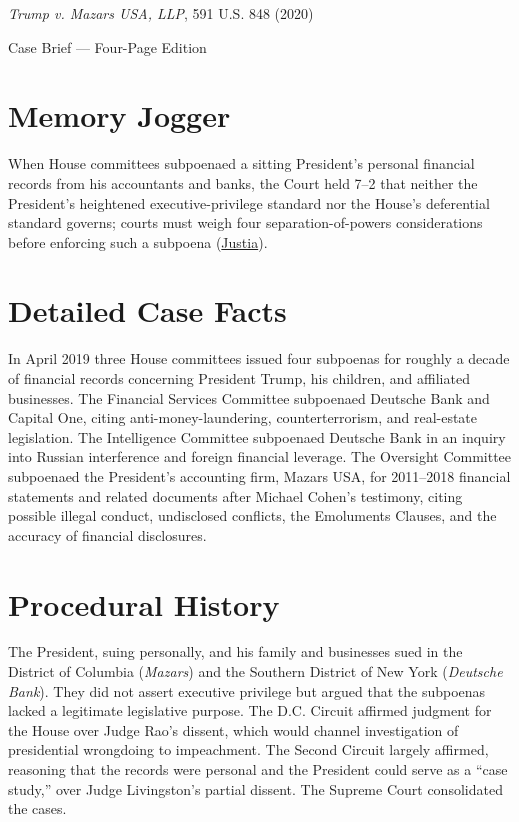 \documentclass[12pt]{article}
\begin{document}
\begin{center}
{\LARGE \textit{Trump v. Mazars USA, LLP}, 591 U.S. 848 (2020)\par}
\vspace{0.8em}
{\large Case Brief --- Four-Page Edition\par}
\end{center}
\vspace{1em}

\section{Memory Jogger}

When House committees subpoenaed a sitting President's personal financial records from his accountants and banks, the Court held 7--2 that neither the President's heightened executive-privilege standard nor the House's deferential standard governs; courts must weigh four separation-of-powers considerations before enforcing such a subpoena (\href{https://supreme.justia.com/cases/federal/us/591/19-715/}{Justia}).

\section{Detailed Case Facts}

In April 2019 three House committees issued four subpoenas for roughly a decade of financial records concerning President Trump, his children, and affiliated businesses. The Financial Services Committee subpoenaed Deutsche Bank and Capital One, citing anti-money-laundering, counterterrorism, and real-estate legislation. The Intelligence Committee subpoenaed Deutsche Bank in an inquiry into Russian interference and foreign financial leverage. The Oversight Committee subpoenaed the President's accounting firm, Mazars USA, for 2011--2018 financial statements and related documents after Michael Cohen's testimony, citing possible illegal conduct, undisclosed conflicts, the Emoluments Clauses, and the accuracy of financial disclosures.

\section{Procedural History}

The President, suing personally, and his family and businesses sued in the District of Columbia (\textit{Mazars}) and the Southern District of New York (\textit{Deutsche Bank}). They did not assert executive privilege but argued that the subpoenas lacked a legitimate legislative purpose. The D.C. Circuit affirmed judgment for the House over Judge Rao's dissent, which would channel investigation of presidential wrongdoing to impeachment. The Second Circuit largely affirmed, reasoning that the records were personal and the President could serve as a ``case study,'' over Judge Livingston's partial dissent. The Supreme Court consolidated the cases.
\end{document}
